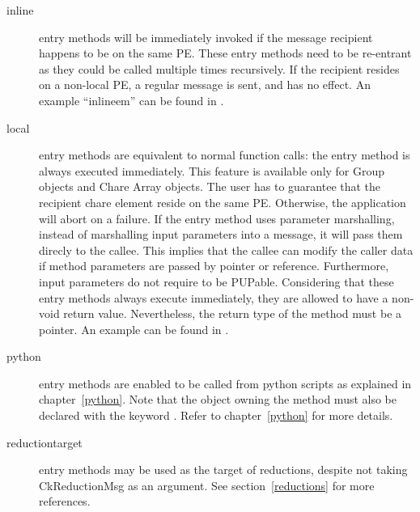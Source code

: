 \begin{description}
\item[inline] entry methods will be immediately invoked if the
message recipient happens to be on the same PE. These entry methods need to be
re-entrant as they could be called multiple times recursively. If the recipient
resides on a non-local PE, a regular message is sent, and  has no
effect. An example ``inlineem'' can be found in .

\item[local] entry methods are equivalent to normal function
calls: the entry method is always executed immediately. This feature is
available only for Group objects and Chare Array objects. The user has to
guarantee that the recipient chare element reside on the same PE. Otherwise,
the application will abort on a failure. If the  entry method uses
parameter marshalling, instead of marshalling input parameters into a message,
it will pass them direcly to the callee. This implies that the callee can
modify the caller data if method parameters are passed by pointer or reference.
Furthermore, input parameters do not require to be PUPable. Considering that
these entry methods always execute immediately, they are allowed to have a
non-void return value. Nevertheless, the return type of the method must be a
pointer. An example can be found in .

\item[python] entry methods are enabled to be
called from python scripts as explained in chapter~\ref{python}. Note that the object owning the method must also be declared with the
keyword . Refer to chapter~\ref{python} for more details.

\item[reductiontarget] entry methods may be used as the
target of reductions, despite not taking CkReductionMsg as an argument.
See section~\ref{reductions} for more references.

\end{description}
